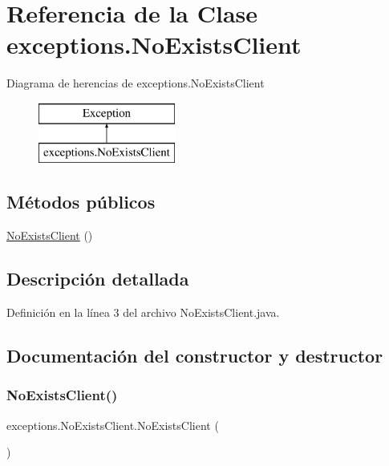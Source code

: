 \hypertarget{classexceptions_1_1_no_exists_client}{}\section{Referencia de la Clase exceptions.\+No\+Exists\+Client}
\label{classexceptions_1_1_no_exists_client}
Diagrama de herencias de exceptions.\+No\+Exists\+Client\begin{figure}[H]
\begin{center}
\leavevmode
\includegraphics[height=2.000000cm]{classexceptions_1_1_no_exists_client}
\end{center}
\end{figure}
\subsection*{Métodos públicos}
\begin{DoxyCompactItemize}
\item 
\mbox{\hyperlink{classexceptions_1_1_no_exists_client_a9a6894befcd9b7d9861cf6f96e004406}{No\+Exists\+Client}} ()
\end{DoxyCompactItemize}


\subsection{Descripción detallada}


Definición en la línea 3 del archivo No\+Exists\+Client.\+java.



\subsection{Documentación del constructor y destructor}
\mbox{\label{classexceptions_1_1_no_exists_client_a9a6894befcd9b7d9861cf6f96e004406}} 
\subsubsection{\texorpdfstring{NoExistsClient()}{NoExistsClient()}}
{\footnotesize\ttfamily exceptions.\+No\+Exists\+Client.\+No\+Exists\+Client (\begin{DoxyParamCaption}{ }\end{DoxyParamCaption})}



